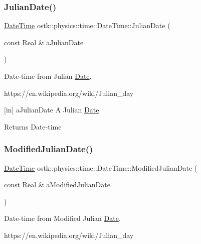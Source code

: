 \subsubsection{\texorpdfstring{Julian\+Date()}{JulianDate()}}
{\footnotesize\ttfamily \hyperlink{classostk_1_1physics_1_1time_1_1_date_time}{Date\+Time} ostk\+::physics\+::time\+::\+Date\+Time\+::\+Julian\+Date (\begin{DoxyParamCaption}\item[{const Real \&}]{a\+Julian\+Date }\end{DoxyParamCaption})\hspace{0.3cm}{\ttfamily [static]}}



Date-\/time from Julian \hyperlink{classostk_1_1physics_1_1time_1_1_date}{Date}. 

https\+://en.wikipedia.\+org/wiki/\+Julian\+\_\+day

\mbox{[}in\mbox{]} a\+Julian\+Date A Julian \hyperlink{classostk_1_1physics_1_1time_1_1_date}{Date} \begin{DoxyReturn}{Returns}
Date-\/time 
\end{DoxyReturn}
\mbox{\label{classostk_1_1physics_1_1time_1_1_date_time_a9584452e9ad5f915c5a540a070910556}} 
\subsubsection{\texorpdfstring{Modified\+Julian\+Date()}{ModifiedJulianDate()}}
{\footnotesize\ttfamily \hyperlink{classostk_1_1physics_1_1time_1_1_date_time}{Date\+Time} ostk\+::physics\+::time\+::\+Date\+Time\+::\+Modified\+Julian\+Date (\begin{DoxyParamCaption}\item[{const Real \&}]{a\+Modified\+Julian\+Date }\end{DoxyParamCaption})\hspace{0.3cm}{\ttfamily [static]}}



Date-\/time from Modified Julian \hyperlink{classostk_1_1physics_1_1time_1_1_date}{Date}. 

https\+://en.wikipedia.\+org/wiki/\+Julian\+\_\+day

